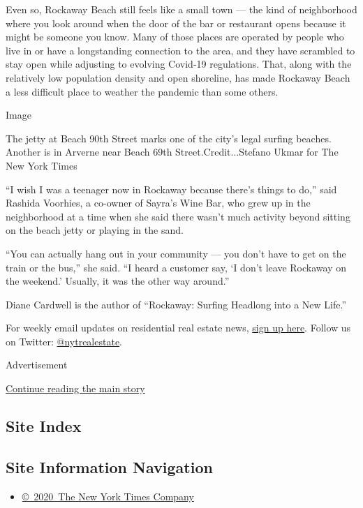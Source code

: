 Even so, Rockaway Beach still feels like a small town --- the kind of
neighborhood where you look around when the door of the bar or
restaurant opens because it might be someone you know. Many of those
places are operated by people who live in or have a longstanding
connection to the area, and they have scrambled to stay open while
adjusting to evolving Covid-19 regulations. That, along with the
relatively low population density and open shoreline, has made Rockaway
Beach a less difficult place to weather the pandemic than some others.

Image

The jetty at Beach 90th Street marks one of the city's legal surfing
beaches. Another is in Arverne near Beach 69th Street.Credit...Stefano
Ukmar for The New York Times

``I wish I was a teenager now in Rockaway because there's things to
do,'' said Rashida Voorhies, a co-owner of Sayra's Wine Bar, who grew up
in the neighborhood at a time when she said there wasn't much activity
beyond sitting on the beach jetty or playing in the sand.

``You can actually hang out in your community --- you don't have to get
on the train or the bus,'' she said. ``I heard a customer say, `I don't
leave Rockaway on the weekend.' Usually, it was the other way around.''

Diane Cardwell is the author of ``Rockaway: Surfing Headlong into a New
Life.''

For weekly email updates on residential real estate news,
\href{http://www.nytimes3xbfgragh.onion/newsletters/realestate/}{sign up
here}. Follow us on Twitter:
\href{https://twitter.com/nytrealestate}{@nytrealestate}.

Advertisement

\protect\hyperlink{after-bottom}{Continue reading the main story}

\hypertarget{site-index}{%
\subsection{Site Index}\label{site-index}}

\hypertarget{site-information-navigation}{%
\subsection{Site Information
Navigation}\label{site-information-navigation}}

\begin{itemize}
\tightlist
\item
  \href{https://help.nytimes3xbfgragh.onion/hc/en-us/articles/115014792127-Copyright-notice}{©~2020~The
  New York Times Company}
\end{itemize}

